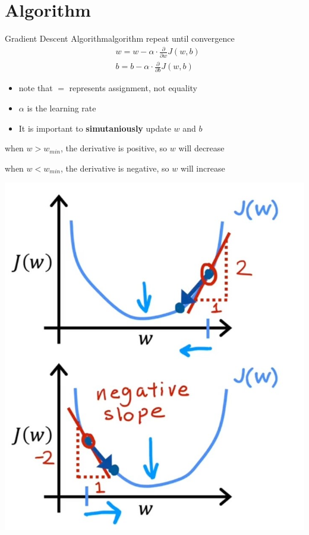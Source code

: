 \section{Algorithm}
\begin{thmbox}{Gradient Descent Algorithm}{algorithm}
repeat until convergence
\begin{align}
    &w = w - \alpha \cdot \frac{\partial}{\partial w} J(w, b) \\
    &b = b - \alpha \cdot \frac{\partial}{\partial b} J(w, b)
\end{align}
\tcblower

\begin{minipage}{0.5\textwidth}
    \begin{itemize}
    \item note that $=$ represents assignment, not equality
    \item $\alpha$ is the learning rate
    \item It is important to \textbf{simutaniously} update $w$ and $b$
    \end{itemize}
    
    \begin{notebox}
        when $w > w_{min}$, the derivative is positive, so $w$ will decrease\par
        when $w < w_{min}$, the derivative is negative, so $w$ will increase
    \end{notebox}
\end{minipage}
\qquad
\begin{minipage}{0.4\textwidth}
\includegraphics[width=\textwidth]{images/2.3_1}
\end{minipage}
\end{thmbox}

